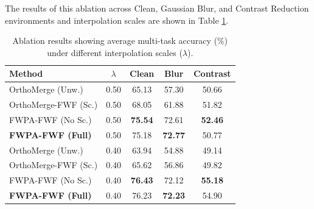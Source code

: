\documentclass{article}
\theoremstyle{plain}
\theoremstyle{definition}
\theoremstyle{remark}
\begin{document}
The results of this ablation across Clean, Gaussian Blur, and Contrast Reduction environments and interpolation scales are shown in Table \ref{tab:ablation}.

\begin{table}[tb]
\caption{Ablation results showing average multi-task accuracy (\%) under different interpolation scales ($\lambda$).}
\label{tab:ablation}
\vskip 0.02in
\begin{center}
\begin{scriptsize}
\begin{sc}
\setlength{\tabcolsep}{4.0pt}
\begin{tabular}{lcccc}
\toprule
Method & $\lambda$ & Clean & Blur & Contrast \\
\midrule
OrthoMerge (Unw.) & 0.50 & 65.13 & 57.30 & 50.66 \\
OrthoMerge-FWF (Sc.) & 0.50 & 68.05 & 61.88 & 51.82 \\
FWPA-FWF (No Sc.) & 0.50 & \textbf{75.54} & 72.61 & \textbf{52.46} \\
\textbf{FWPA-FWF (Full)} & 0.50 & 75.18 & \textbf{72.77} & 50.77 \\
\midrule
OrthoMerge (Unw.) & 0.40 & 63.94 & 54.88 & 49.14 \\
OrthoMerge-FWF (Sc.) & 0.40 & 65.62 & 56.86 & 49.82 \\
FWPA-FWF (No Sc.) & 0.40 & \textbf{76.43} & 72.12 & \textbf{55.18} \\
\textbf{FWPA-FWF (Full)} & 0.40 & 76.23 & \textbf{72.23} & 54.90 \\
\bottomrule
\end{tabular}
\end{sc}
\end{scriptsize}
\end{center}
\vskip -0.15in
\end{table}
\end{document}

